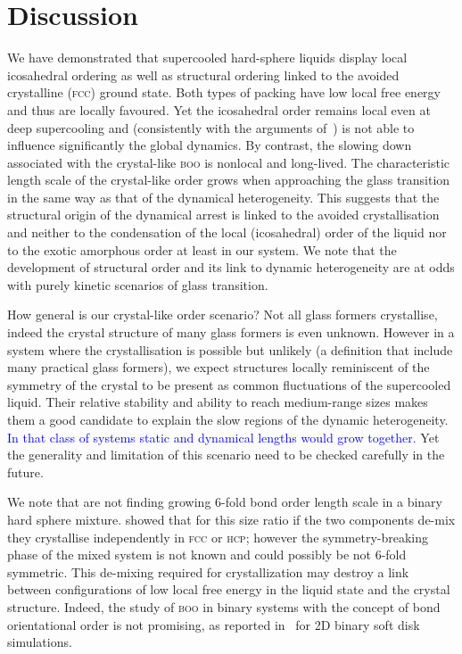 \section*{Discussion}
We have demonstrated that supercooled hard-sphere liquids display local icosahedral ordering as well as structural ordering linked to the avoided crystalline (\textsc{fcc}) ground state. Both types of packing have low local free energy and thus are locally favoured. Yet the icosahedral order remains local even at deep supercooling and (consistently with the arguments of~\citep{Berthier2007}) is not able to influence significantly the global dynamics. By contrast, the slowing down associated with the crystal-like \textsc{boo} is nonlocal and long-lived. The characteristic length scale of the crystal-like order grows when approaching the glass transition in the same way as that of the dynamical heterogeneity. This suggests that the structural origin of the dynamical arrest is linked to the avoided crystallisation and neither to the condensation of the local (icosahedral) order of the liquid nor to the exotic amorphous order at least in our system. We note that the development of structural order and its link to dynamic heterogeneity are at odds with purely kinetic scenarios of glass transition.

How general is our crystal-like order scenario? Not all glass formers crystallise, indeed the crystal structure of many glass formers is even unknown. However in a system where the crystallisation is possible but unlikely (a definition that include many practical glass formers), we expect structures locally reminiscent of the symmetry of the crystal to be present as common fluctuations of the supercooled liquid. Their relative stability and ability to reach medium-range sizes makes them a good candidate to explain the slow regions of the dynamic heterogeneity. \textcolor{blue}{In that class of systems static and dynamical lengths would grow together.} Yet the generality and limitation of this scenario need to be checked carefully in the future.

We note that \citet{Charbonneau} are not finding growing 6-fold bond order length scale in a binary hard sphere mixture. \citet{Hopkins2011b,Hopkins2012} showed that for this size ratio if the two components de-mix they crystallise independently in \textsc{fcc} or \textsc{hcp}; however the symmetry-breaking phase of the mixed system is not known and could possibly be not 6-fold symmetric. This de-mixing required for crystallization may destroy a link between configurations of low local free energy in the liquid state and the crystal structure. Indeed, the study of \textsc{boo} in binary systems with the concept of bond orientational order is not promising, as reported in~\citep{tanaka2010critical, KawasakiJPCM} for 2D binary soft disk simulations.

